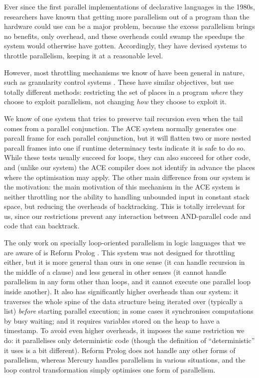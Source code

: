 Ever since the first parallel implementations
of declarative languages in the 1980s,
researchers have known that getting more parallelism out of a program
than the hardware could use can be a major problem,
because the excess parallelism brings no benefits, only overhead,
and these overheads could swamp
the speedups the system would otherwise have gotten.
Accordingly, they have devised systems to throttle parallelism,
keeping it at a reasonable level.

However, most throttling mechanisms we know of
have been general in nature,
such as granularity control systems
\citep{lopez96:granularity,
king:lower_bound_time_complexity,
shen_98_granularity-control}.
These have similar objectives,
but use totally different methods:
restricting the set of places in a program
\emph{where} they choose to exploit parallelism,
not changing \emph{how} they choose to exploit it.

We know of one system that tries to preserve tail recursion
even when the tail comes from a parallel conjunction.
The ACE system \citep{gupta01:optimization_for_parallel_nodet_code}
normally generates one parcall frame for each parallel conjunction,
but it will flatten two or more nested parcall frames into one
if runtime determinacy tests indicate it is safe to do so.
While these tests usually succeed for loops,
they can also succeed for other code,
and (unlike our system) the ACE compiler does not identify in advance
the places where the optimisation may apply.
The other main difference from our system is the motivation:
the main motivation of this mechanism in the ACE system is
neither throttling
nor the ability to handling unbounded input in constant stack space,
but reducing the overheads of backtracking.
This is totally irrelevant for us,
since our restrictions prevent any interaction
between AND-parallel code and code that can backtrack.

The only work on specially loop-oriented parallelism in logic languages
that we are aware of is Reform Prolog \citep{bevemyr:reform}.
This system was not designed for throttling either,
but it is more general than ours in one sense
(it can handle recursion in the middle of a clause)
and less general in other senses
(it cannot handle parallelism in any form other than loops,
and it cannot execute one parallel loop inside another).
It also has significantly higher overheads than our system:
it traverses the whole spine of the data structure being iterated over
(typically a list) \emph{before} starting parallel execution;
in some cases it synchronises computations by busy waiting;
and it requires variables stored on the heap to have a timestamp.
To avoid even higher overheads,
it imposes the same restriction we do:
it parallelises only deterministic code
(though the definition of ``deterministic'' it uses is a bit different).
Reform Prolog does not handle any other forms of parallelism,
whereas Mercury handles parallelism in various situations,
and the loop control transformation simply optimises one form of
parallelism.

